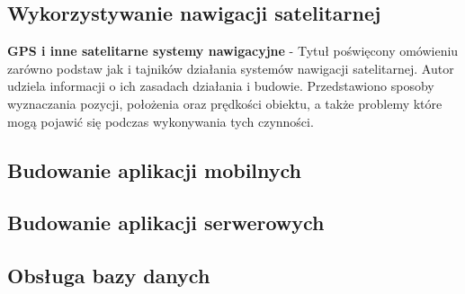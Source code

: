 \subsection{Wykorzystywanie nawigacji satelitarnej}
\textbf{GPS i inne satelitarne systemy nawigacyjne} \cite{gps2} - Tytuł poświęcony omówieniu zarówno podstaw jak i tajników działania systemów nawigacji satelitarnej. Autor udziela informacji o ich zasadach działania i budowie. Przedstawiono sposoby wyznaczania pozycji, położenia oraz prędkości obiektu, a także problemy które mogą pojawić się podczas wykonywania tych czynności.
\subsection{Budowanie aplikacji mobilnych}
\subsection{Budowanie aplikacji serwerowych}
\subsection{Obsługa bazy danych}

